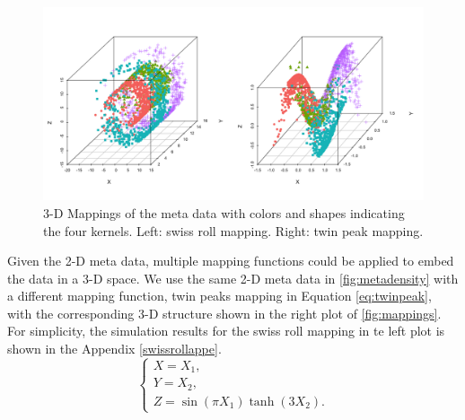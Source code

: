 \documentclass[11pt,a4paper,]{article}
\begin{document}
\begin{figure}

{\centering \includegraphics[width=0.8\linewidth]{figures/mappings_sr_tp} 

}

\caption{3-D Mappings of the meta data with colors and shapes indicating the four kernels. Left: swiss roll mapping. Right: twin peak mapping.}\label{fig:mappings}
\end{figure}

Given the 2-D meta data, multiple mapping functions could be applied to embed the data in a 3-D space. We use the same 2-D meta data in \autoref{fig:metadensity} with a different mapping function, twin peaks
mapping in Equation \eqref{eq:twinpeak}, with the corresponding 3-D structure shown in the right plot of \autoref{fig:mappings}. For simplicity, the simulation results for the swiss roll mapping in te left plot is shown in the Appendix \autoref{swissrollappe}.
\begin{equation}
\label{eq:twinpeak}
\left\{ 
\begin{array}{lcl}
X = X_1, \\
Y = X_2, \\
Z = \sin(\pi X_1) \tanh (3 X_2).
\end{array}
\right.
\end{equation}
\end{document}
